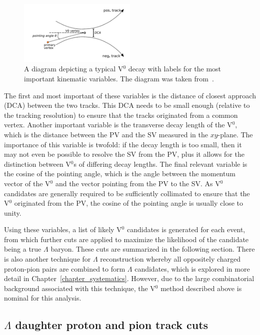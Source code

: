 \begin{figure}[h]
	\centering
	\includegraphics[width=0.5\textwidth]{figures/analysis/v0_decay.png}
	\caption{A diagram depicting a typical V$^0$ decay with labels for the most important kinematic variables. The diagram was taken from~\cite{V0Decay}.}
	\label{fig:v0_decay}
\end{figure}

The first and most important of these variables is the distance of closest approach (DCA) between the two tracks. This DCA needs to be small enough (relative to the tracking resolution) to ensure that the tracks originated from a common vertex. Another important variable is the transverse decay length of the V$^0$, which is the distance between the PV and the SV measured in the $xy$-plane. The importance of this variable is twofold: if the decay length is too small, then it may not even be possible to resolve the SV from the PV, plus it allows for the distinction between V$^0$s of differing decay lengths. The final relevant variable is the cosine of the pointing angle, which is the angle between the momentum vector of the V$^0$ and the vector pointing from the PV to the SV. As V$^0$ candidates are generally required to be sufficiently collimated to ensure that the V$^0$ originated from the PV, the cosine of the pointing angle is usually close to unity.

Using these variables, a list of likely V$^0$ candidates is generated for each event, from which further cuts are applied to maximize the likelihood of the candidate being a true $\Lambda$ baryon. These cuts are summarized in the following section. There is also another technique for $\Lambda$ reconstruction whereby all oppositely charged proton-pion pairs are combined to form $\Lambda$ candidates, which is explored in more detail in Chapter~\ref{chapter_systematics}. However, due to the large combinatorial background associated with this technique, the V$^0$ method described above is nominal for this analysis.


\subsection{$\Lambda$ daughter proton and pion track cuts}


